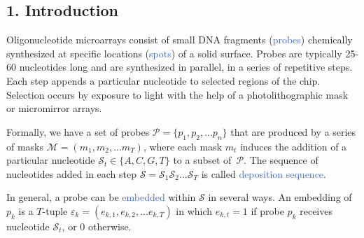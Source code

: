 \documentclass[portrait]{a0poster}
\newcommand{\ds}{\mathcal{S}}
\newcommand{\myemph}[1]{\textcolor{highlight}{#1}}
\begin{document}
\sffamily				%
\large					%
\setlength{\columnsep}{96pt}		%
\setlength{\columnseprule}{1pt}		%
\setlength{\multicolsep}{96pt}		%

\setlength{\parindent}{0em}

\begin{multicols}{3}[\aggiheader]


\setlength{\parskip}{5mm}

\section*{\textcolor{aggigreen}{1. Introduction}}

Oligonucleotide microarrays consist of small DNA fragments
(\myemph{probes}) chemically synthesized at specific locations
(\myemph{spots}) of a solid surface. Probes are typically 25-60 nucleotides
long and are synthesized in parallel, in a series of repetitive steps. Each step
appends a particular nucleotide to selected regions of the chip. Selection
occurs by exposure to light with the help of a photolithographic mask or
micromirror arrays.

Formally, we have a set of probes
$\mathcal{P} = \{p_{1}, p_{2}, ... p_{n}\}$ that are produced by a series of
masks $\mathcal{M} = (m_{1}, m_{2}, ... m_T)$, where each mask $m_{t}$ induces
the addition of a particular nucleotide $\ds_{t} \in \{A, C, G, T\}$ to a subset
of~$\mathcal{P}$. The sequence of nucleotides added in each step
$\ds = \ds_{1} \ds_{2} \ldots \ds_{T}$ is called
\myemph{deposition sequence}.

In general, a probe can be \myemph{embedded} within
$\mathcal{S}$ in several ways. An embedding of $p_k$ is a $T$-tuple
$\varepsilon_{k} = (e_{k,1}, e_{k,2}, ... e_{k,T})$ in which $e_{k,t} = 1$ if
probe $p_{k}$ receives nucleotide $\ds_t$, or 0 otherwise.


\end{multicols}
\end{document}
